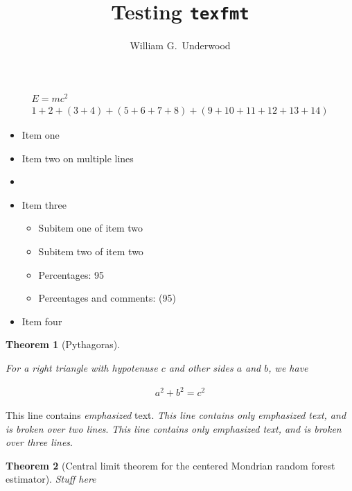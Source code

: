 \documentclass{article}
\title{Testing \texttt{texfmt}}
\author{William G.\ Underwood}
\newtheorem{theorem}{Theorem}
\begin{document}
\maketitle

\begin{align}
  E = m c^2 \\
  1 + 2
  + (3 + 4)
  + (5 + 6
  + 7 + 8)
  + (9 + 10
    + 11 + 12
  + 13 + 14)
\end{align}

\begin{itemize}
  \item Item one 
  \item Item two on
    multiple lines
  \item
  \item Item three
    \begin{itemize}
      \item Subitem one of item two
      \item Subitem two of item two
      \item Percentages: 95
      \item Percentages and comments: (95) 
    \end{itemize}
  \item Item four 
\end{itemize}

\begin{theorem}[Pythagoras]
  \label{thm:pythagoras}

  For a right triangle with hypotenuse $c$ and other sides $a$ and $b$,
  we have

  \begin{align*}
    a^2 + b^2 = c^2
  \end{align*}



\end{theorem}

This line contains \emph{emphasized} text.
\emph{This line contains only emphasized text,
and is broken over two lines}.
\emph{This line contains only
  emphasized text,
and is broken over three lines}.

\begin{theorem}[Central limit theorem for the centered
  Mondrian random forest estimator]
  \label{thm:clt}
  Stuff here
\end{theorem}
\end{document}
